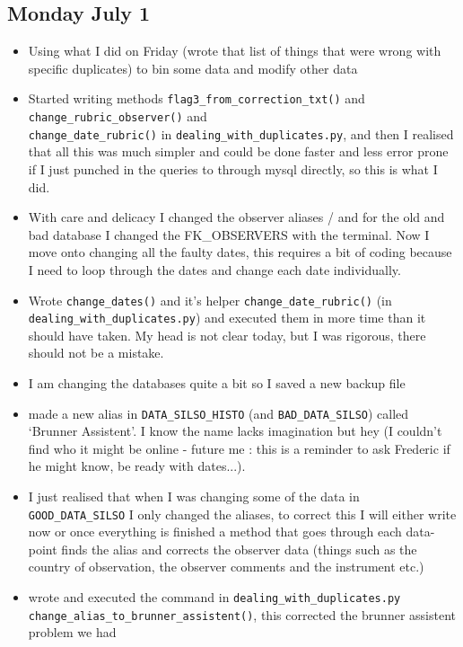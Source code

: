 \documentclass[12pt]{article}
\begin{document}
\subsection{Monday July 1}
\begin{itemize}
    \item Using what I did on Friday (wrote that list of things that were wrong with specific duplicates) to bin some data and modify other data
    \item Started writing methods \texttt{flag3\_from\_correction\_txt()} and \texttt{change\_rubric\_observer()} and\\ \texttt{change\_date\_rubric()} in \texttt{dealing\_with\_duplicates.py}, and then I realised that all this was much simpler and could be done faster and less error prone if I just punched in the queries to through mysql directly, so this is what I did.
    \item With care and delicacy I changed the observer aliases / and for the old and bad database I changed the FK\_OBSERVERS with the terminal. Now I move onto changing all the faulty dates, this requires a bit of coding because I need to loop through the dates and change each date individually.
    \item Wrote \texttt{change\_dates()} and it's helper \texttt{change\_date\_rubric()} (in \texttt{dealing\_with\_duplicates.py}) and executed them in more time than it should have taken. My head is not clear today, but I was rigorous, there should not be a mistake.
    \item I am changing the databases quite a bit so I saved a new backup file
    \item made a new alias in \texttt{DATA\_SILSO\_HISTO} (and \texttt{BAD\_DATA\_SILSO}) called `Brunner Assistent'. I know the name lacks imagination but hey (I couldn't find who it might be online - future me : this is a reminder to ask Frederic if he might know, be ready with dates...).
    \item I just realised that when I was changing some of the data in \texttt{GOOD\_DATA\_SILSO} I only changed the aliases, to correct this I will either write now or once everything is finished a method that goes through each data-point finds the alias and corrects the observer data (things such as the country of observation, the observer comments and the instrument etc.)
    \item wrote and executed the command in \texttt{dealing\_with\_duplicates.py} \texttt{change\_alias\_to\_brunner\_assistent()}, this corrected the brunner assistent problem we had

\end{itemize}
\end{document}
